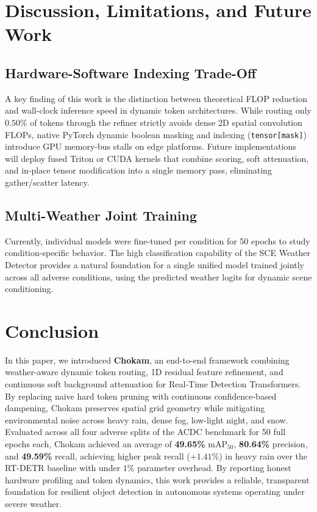 \documentclass[conference]{IEEEtran}
\begin{document}
\section{Discussion, Limitations, and Future Work}
\label{sec:future}

\subsection{Hardware-Software Indexing Trade-Off}
A key finding of this work is the distinction between theoretical FLOP reduction and wall-clock inference speed in dynamic token architectures. While routing only $0.50\%$ of tokens through the refiner strictly avoids dense 2D spatial convolution FLOPs, native PyTorch dynamic boolean masking and indexing (\texttt{tensor[mask]}) introduce GPU memory-bus stalls on edge platforms. Future implementations will deploy fused Triton or CUDA kernels that combine scoring, soft attenuation, and in-place tensor modification into a single memory pass, eliminating gather/scatter latency.

\subsection{Multi-Weather Joint Training}
Currently, individual models were fine-tuned per condition for 50 epochs to study condition-specific behavior. The high classification capability of the SCE Weather Detector provides a natural foundation for a single unified model trained jointly across all adverse conditions, using the predicted weather logits for dynamic scene conditioning.

\section{Conclusion}
In this paper, we introduced \textbf{Chokam}, an end-to-end framework combining weather-aware dynamic token routing, 1D residual feature refinement, and continuous soft background attenuation for Real-Time Detection Transformers. By replacing naive hard token pruning with continuous confidence-based dampening, Chokam preserves spatial grid geometry while mitigating environmental noise across heavy rain, dense fog, low-light night, and snow. Evaluated across all four adverse splits of the ACDC benchmark for 50 full epochs each, Chokam achieved an average of \textbf{49.65\%} $\text{mAP}_{50}$, \textbf{80.64\%} precision, and \textbf{49.59\%} recall, achieving higher peak recall ($+1.41\%$) in heavy rain over the RT-DETR baseline with under $1\%$ parameter overhead. By reporting honest hardware profiling and token dynamics, this work provides a reliable, transparent foundation for resilient object detection in autonomous systems operating under severe weather.
\end{document}
